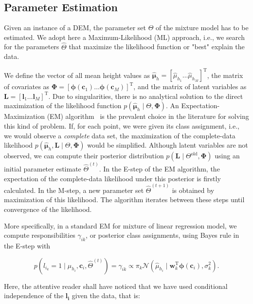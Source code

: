 \subsection{Parameter Estimation}

Given an instance of a DEM, the parameter set $\Theta$ of the mixture model has
to be estimated. We adopt here a Maximum-Likelihood (ML) approach, i.e., we
search for the parameters $\hat{\Theta}$ that maximize the likelihood function
or "best" explain the data.

We define the vector of all mean height values as $\hat{\boldsymbol\mu}_h=
[\hat{\mu}_{h_1}\dots\hat{\mu}_{h_M}]^\text{T}$, the matrix of covariates as
$\boldsymbol{\Phi}=[\boldsymbol{\phi}(\mathbf{c}_1)\dots\boldsymbol{\phi}
(\mathbf{c}_{M})]^\text{T}$, and the matrix of latent variables as
$\mathbf{L}=[\mathbf{l}_1\dots\mathbf{l}_M]^\text{T}$. Due to singularities,
there is no analytical solution to the direct maximization of the likelihood
function $p(\hat{\boldsymbol\mu}_h\mid\Theta,\boldsymbol{\Phi})$. An
Expectation-Maximization (EM) algorithm~\cite{dempster77maximum} is the
prevalent choice in the literature for solving this kind of problem. If, for
each point, we were given its class assignment, i.e., we would observe a
\emph{complete} data set, the maximization of the complete-data likelihood
$p(\hat{\boldsymbol\mu}_h,\mathbf{L}\mid\Theta,\boldsymbol{\Phi})$ would be
simplified. Although latent variables are not observed, we can compute their
posterior distribution $p(\mathbf{L}\mid\Theta^\text{old},\boldsymbol{\Phi})$
using an initial parameter estimate $\hat{\Theta}^{(t)}$. In the E-step of
the EM algorithm, the expectation of the complete-data likelihood under this
posterior is firstly calculated. In the M-step, a new parameter set
$\hat{\Theta}^{(t+1)}$ is obtained by maximization of this likelihood.
The algorithm iterates between these steps until convergence of the likelihood.

More specifically, in a standard EM for mixture of linear regression model, we
compute responsibilities $\gamma_{ik}$, or posterior class assignments, using
Bayes rule in the E-step with

\begin{equation}
\label{eqn:responsibility}
p(l_{i_k}=1\mid\hat{\mu}_{h_i},\mathbf{c}_i,\hat{\Theta}^{(t)})=\gamma_{ik}
\propto\pi_k\mathcal{N}(\hat{\mu}_{h_i}\mid\mathbf{w}_k^\text{T}
\boldsymbol{\phi}(\mathbf{c}_i),\sigma^2_k).
\end{equation}

Here, the attentive reader shall have noticed that we have used conditional
independence of the $\mathbf{l_i}$ given the data, that is:

